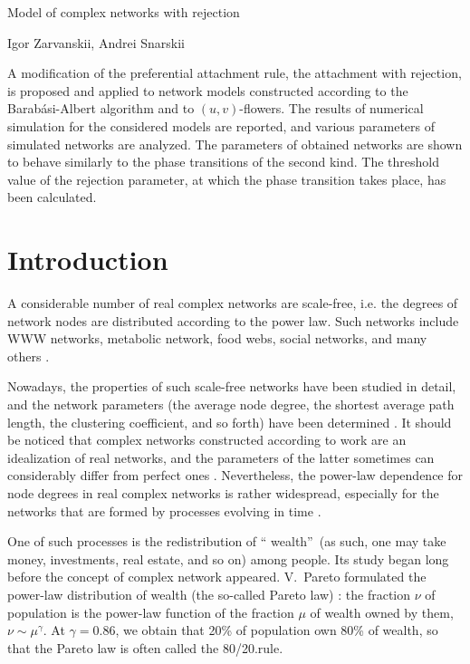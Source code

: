 \documentclass[aps,preprint]{revtex4}%
\begin{document}
Model of complex networks with rejection

\bigskip

Igor Zarvanskii, Andrei Snarskii

\bigskip

A modification of the preferential attachment rule, the attachment with
rejection, is proposed and applied to network models constructed according to
the Barab\'{a}si-Albert algorithm and to $(u,v)$-flowers. The results of
numerical simulation for the considered models are reported, and various
parameters of simulated networks are analyzed. The parameters of obtained
networks are shown to behave similarly to the phase transitions of the second
kind. The threshold value of the rejection parameter, at which the phase
transition takes place, has been calculated.

\bigskip

\section{Introduction}

A considerable number of real complex networks are scale-free, i.e. the
degrees of network nodes are distributed according to the power law. Such
networks include WWW networks, metabolic network, food webs, social networks,
and many others \cite{Dor2}.

Nowadays, the properties of such scale-free networks have been studied in
detail, and the network parameters (the average node degree, the shortest
average path length, the clustering coefficient, and so forth) have been
determined \cite{Newman1}. It should be noticed that complex networks
constructed according to work \cite{AlBa2} are an idealization of real
networks, and the parameters of the latter sometimes can considerably differ
from perfect ones \cite{Newman1}. Nevertheless, the power-law dependence for
node degrees in real complex networks is rather widespread, especially for the
networks that are formed by processes evolving in time \cite{Newman3, AlBa3}.

One of such processes is the redistribution of \textquotedblleft
wealth\textquotedblright\ (as such, one may take money, investments, real
estate, and so on) among people. Its study began long before the concept of
complex network appeared. V.~Pareto formulated the power-law distribution of
wealth (the so-called Pareto law) \cite{Pareto}: the fraction $\nu$ of
population is the power-law function of the fraction $\mu$ of wealth owned by
them, $\nu\sim\mu^{\gamma}$. At $\gamma=0.86$, we obtain that 20\% of
population own 80\% of wealth, so that the Pareto law is often called the 80/20.rule.
\end{document}
